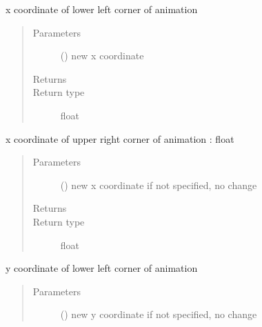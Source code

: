 \documentclass[letterpaper,10pt,english]{sphinxmanual}
\begin{document}
\begin{fulllineitems}
\begin{fulllineitems}
\label{\detokenize{Reference:salabim.Environment.x0}}
x coordinate of lower left corner of animation
\begin{quote}\begin{description}
\item[{Parameters}] \leavevmode
{} () \textendash{} new x coordinate

\item[{Returns}] \leavevmode
{}

\item[{Return type}] \leavevmode
float

\end{description}\end{quote}

\end{fulllineitems}


\begin{fulllineitems}
\label{\detokenize{Reference:salabim.Environment.x1}}
x coordinate of upper right corner of animation : float
\begin{quote}\begin{description}
\item[{Parameters}] \leavevmode
{} () \textendash{} new x coordinate 
if not specified, no change

\item[{Returns}] \leavevmode
{}

\item[{Return type}] \leavevmode
float

\end{description}\end{quote}

\end{fulllineitems}


\begin{fulllineitems}
\label{\detokenize{Reference:salabim.Environment.y0}}
y coordinate of lower left corner of animation
\begin{quote}\begin{description}
\item[{Parameters}] \leavevmode
{} () \textendash{} new y coordinate 
if not specified, no change


\end{description}
\end{quote}
\end{fulllineitems}
\end{fulllineitems}
\end{document}
